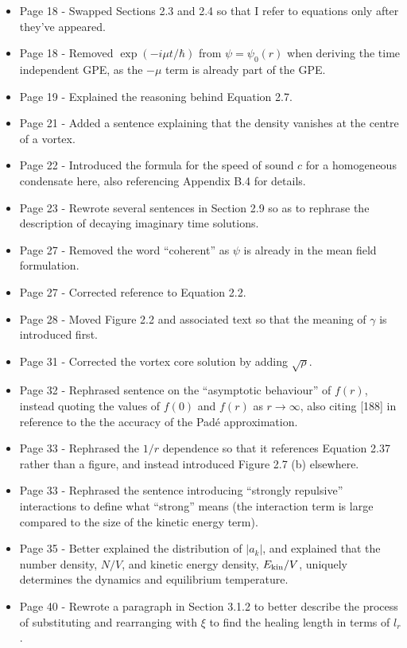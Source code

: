 \documentclass{article}
\begin{document}
\begin{itemize}
\item Page 18 - Swapped Sections 2.3 and 2.4 so that I refer to equations only after they've appeared.
\item Page 18 - Removed $\exp (-i\mu t / \hbar)$ from $\psi = \psi_0(r)$ when deriving the time independent GPE, as the $-\mu$ term is already part of the GPE.
\item Page 19 - Explained the reasoning behind Equation 2.7.
\item Page 21 - Added a sentence explaining that the density vanishes at the centre of a vortex.
\item Page 22 - Introduced the formula for the speed of sound $c$ for a homogeneous condensate here, also referencing Appendix B.4 for details.
\item Page 23 - Rewrote several sentences in Section 2.9 so as to rephrase the description of decaying imaginary time solutions.
\item Page 27 - Removed the word ``coherent'' as $\psi$ is already in the mean field formulation.
\item Page 27 - Corrected reference to Equation 2.2.
\item Page 28 - Moved Figure 2.2 and associated text so that the meaning of $\gamma$ is introduced first.
\item Page 31 - Corrected the vortex core solution by adding $\sqrt{\rho}$.
\item Page 32 - Rephrased sentence on the ``asymptotic behaviour'' of $f(r)$, instead quoting the values of $f(0)$ and $f(r)$ as $r\rightarrow\infty$, also citing [188] in reference to the the accuracy of the Pad\'e approximation.
\item Page 33 - Rephrased the $1/r$ dependence so that it references Equation 2.37 rather than a figure, and instead introduced Figure 2.7 (b) elsewhere.
\item Page 33 - Rephrased the sentence introducing ``strongly repulsive'' interactions to define what ``strong'' means (the interaction term is large compared to the size of the kinetic energy term).
\item Page 35 - Better explained the distribution of $|a_k|$, and explained that the number density, $N/V$, and kinetic energy density, $E_{\rm kin}/V$, uniquely determines the dynamics and equilibrium temperature.
\item Page 40 - Rewrote a paragraph in Section 3.1.2 to better describe the process of substituting and rearranging with $\xi$ to find the healing length in terms of $l_r$.

\end{itemize}
\end{document}
